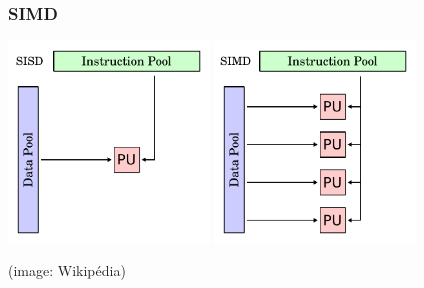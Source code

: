 \documentclass[xcolor={x11names,svgnames}]{beamer}
\begin{document}
\begin{frame}
\frametitle{SIMD}

\includegraphics[width=0.4\textwidth]{SISD}
\hfill
\includegraphics[width=0.4\textwidth]{SIMD}

\hfill (image: Wikipédia)

\end{frame}



\end{document}
